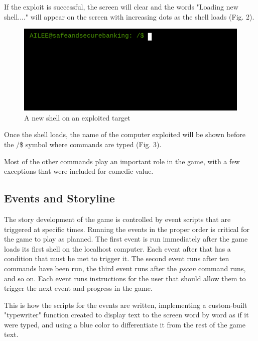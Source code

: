 \documentclass[conference]{IEEEtran}
\begin{document}
If the exploit is successful, the screen will clear and the words "Loading new shell...." will appear on the screen with increasing dots as the shell loads (Fig. 2).

\begin{figure}[htbp]
	\centerline{\includegraphics[scale=2]{access-granted}}
	\caption{A new shell on an exploited target}
	\label{fig}
\end{figure}

Once the shell loads, the name of the computer exploited will be shown before the /\$ symbol where commands are typed (Fig. 3).

Most of the other commands play an important role in the game, with a few exceptions that were included for comedic value.

\subsection{Events and Storyline}

The story development of the game is controlled by event scripts that are triggered at specific times. Running the events in the proper order is critical for the game to play as planned. The first event is run immediately after the game loads its first shell on the localhost computer. Each event after that has a condition that must be met to trigger it. The second event runs after ten commands have been run, the third event runs after the \textit{pscan} command runs, and so on. Each event runs instructions for the user that should allow them to trigger the next event and progress in the game.



This is how the scripts for the events are written, implementing a custom-built "typewriter" function created to display text to the screen word by word as if it were typed, and using a blue color to differentiate it from the rest of the game text. 
\end{document}
